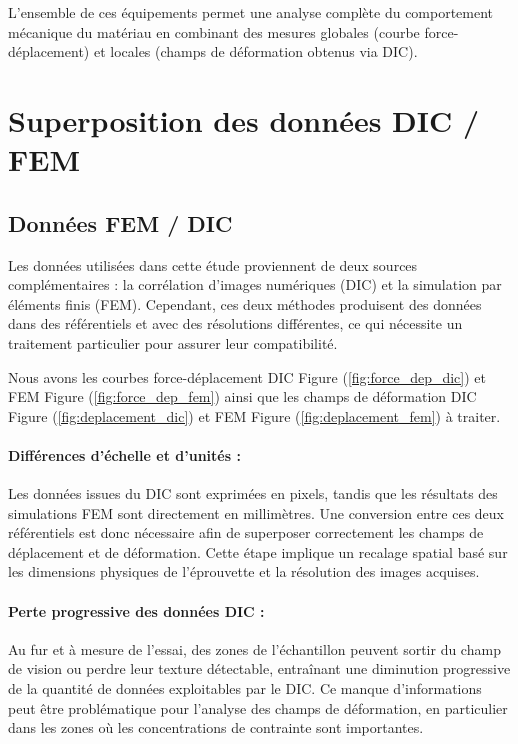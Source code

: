 \documentclass[12pt,a4paper]{article}
\begin{document}
L'ensemble de ces équipements permet une analyse complète du comportement mécanique du matériau en combinant des mesures globales (courbe force-déplacement) et locales (champs de déformation obtenus via DIC).


\section{Superposition des données DIC / FEM}
\subsection{Données FEM / DIC}
Les données utilisées dans cette étude proviennent de deux sources complémentaires : la corrélation d’images numériques (DIC) et la simulation par éléments finis (FEM). Cependant, ces deux méthodes produisent des données dans des référentiels et avec des résolutions différentes, ce qui nécessite un traitement particulier pour assurer leur compatibilité.

Nous avons les courbes force-déplacement DIC Figure (\ref{fig:force_dep_dic}) et FEM Figure (\ref{fig:force_dep_fem}) ainsi que les champs de déformation DIC Figure (\ref{fig:deplacement_dic}) et FEM Figure (\ref{fig:deplacement_fem}) à traiter.

\paragraph{Différences d’échelle et d’unités :}  
Les données issues du DIC sont exprimées en pixels, tandis que les résultats des simulations FEM sont directement en millimètres. Une conversion entre ces deux référentiels est donc nécessaire afin de superposer correctement les champs de déplacement et de déformation. Cette étape implique un recalage spatial basé sur les dimensions physiques de l’éprouvette et la résolution des images acquises.

\paragraph{Perte progressive des données DIC :}  
Au fur et à mesure de l’essai, des zones de l’échantillon peuvent sortir du champ de vision ou perdre leur texture détectable, entraînant une diminution progressive de la quantité de données exploitables par le DIC. Ce manque d’informations peut être problématique pour l’analyse des champs de déformation, en particulier dans les zones où les concentrations de contrainte sont importantes.
\end{document}

